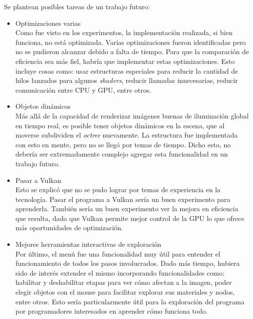 Se plantean posibles tareas de un trabajo futuro:
\begin{itemize}
    \item Optimizaciones varias\\
        Como fue visto en los experimentos, la implementación realizada, si bien funciona, no está optimizada.
        Varias optimizaciones fueron identificadas pero no se pudieron alcanzar debido a falta de tiempo.
        Para que la comparación de eficiencia sea más fiel, habría que implementar estas optimizaciones.
        Esto incluye cosas como: usar estructuras especiales para reducir la cantidad de hilos lanzados para algunos \textit{shaders}, reducir llamadas innecesarias, reducir comunicación entre CPU y GPU, entre otros.
    \item Objetos dinámicos\\
        Más allá de la capacidad de renderizar imágenes buenas de iluminación global en tiempo real, es posible tener objetos dinámicos en la escena, que al moverse subdividen el \textit{octree} nuevamente.
        La estructura fue implementada con esto en mente, pero no se llegó por temas de tiempo.
        Dicho esto, no debería ser extremadamente complejo agregar esta funcionalidad en un trabajo futuro.
    \item Pasar a Vulkan\\
        Esto se explicó que no se pudo lograr por temas de experiencia en la tecnología.
        Pasar el programa a Vulkan sería un buen experimento para aprenderla.
        También sería un buen experimento ver la mejora en eficiencia que resulta, dado que Vulkan permite mejor control de la GPU lo que ofrece más oportunidades de optimización.
    \item Mejores herramientas interactivas de exploración\\
        Por último, el menú fue una funcionalidad muy útil para entender el funcionamiento de todos los pasos involucrados.
        Dado más tiempo, hubiera sido de interés extender el mismo incorporando funcionalidades como: habilitar y deshabilitar etapas para ver cómo afectan a la imagen, poder elegir objetos con el mouse para facilitar explorar sus materiales y nodos, entre otros.
        Esto sería particularmente útil para la exploración del programa por programadores interesados en aprender cómo funciona todo.
\end{itemize}


